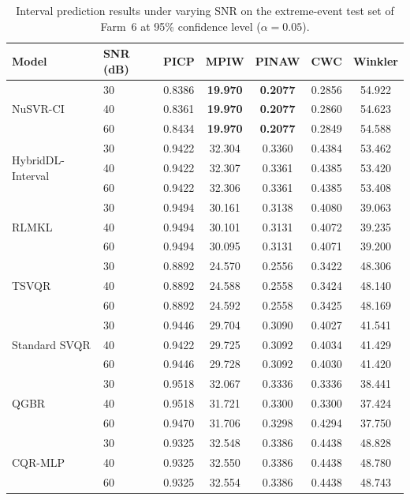\documentclass[a4paper]{cas-sc}
\begin{document}
\begin{table}[ht]
\centering
\caption{Interval prediction results under varying SNR on the extreme-event test set of Farm~6 at 95\% confidence level ($\alpha = 0.05$).}
\setlength{\tabcolsep}{3.0mm}
\begin{tabular}{llccccc}
\toprule
Model & SNR (dB) & PICP & MPIW & PINAW & CWC & Winkler \\
\midrule
\multirow{3}{*}{NuSVR-CI}
  & 30 & 0.8386 & \textbf{19.970} & \textbf{0.2077} & 0.2856 & 54.922 \\
  & 40 & 0.8361 & \textbf{19.970} & \textbf{0.2077} & 0.2860 & 54.623 \\
  & 60 & 0.8434 & \textbf{19.970} & \textbf{0.2077} & 0.2849 & 54.588 \\
\multirow{3}{*}{HybridDL-Interval}
  & 30 & 0.9422 & 32.304 & 0.3360 & 0.4384 & 53.462 \\
  & 40 & 0.9422 & 32.307 & 0.3361 & 0.4385 & 53.420 \\
  & 60 & 0.9422 & 32.306 & 0.3361 & 0.4385 & 53.408 \\
\multirow{3}{*}{RLMKL}
  & 30 & 0.9494 & 30.161 & 0.3138 & 0.4080 & 39.063 \\
  & 40 & 0.9494 & 30.101 & 0.3131 & 0.4072 & 39.235 \\
  & 60 & 0.9494 & 30.095 & 0.3131 & 0.4071 & 39.200 \\
\multirow{3}{*}{TSVQR}
  & 30 & 0.8892 & 24.570 & 0.2556 & 0.3422 & 48.306 \\
  & 40 & 0.8892 & 24.588 & 0.2558 & 0.3424 & 48.140 \\
  & 60 & 0.8892 & 24.592 & 0.2558 & 0.3425 & 48.169 \\
\multirow{3}{*}{Standard SVQR}
  & 30 & 0.9446 & 29.704 & 0.3090 & 0.4027 & 41.541 \\
  & 40 & 0.9422 & 29.725 & 0.3092 & 0.4034 & 41.429 \\
  & 60 & 0.9446 & 29.728 & 0.3092 & 0.4030 & 41.420 \\
\multirow{3}{*}{QGBR}
  & 30 & 0.9518 & 32.067 & 0.3336 & 0.3336 & 38.441 \\
  & 40 & 0.9518 & 31.721 & 0.3300 & 0.3300 & 37.424 \\
  & 60 & 0.9470 & 31.706 & 0.3298 & 0.4294 & 37.750 \\
\multirow{3}{*}{CQR-MLP}
  & 30 & 0.9325 & 32.548 & 0.3386 & 0.4438 & 48.828 \\
  & 40 & 0.9325 & 32.550 & 0.3386 & 0.4438 & 48.780 \\
  & 60 & 0.9325 & 32.554 & 0.3386 & 0.4438 & 48.743 \\

\end{tabular}
\end{table}
\end{document}
